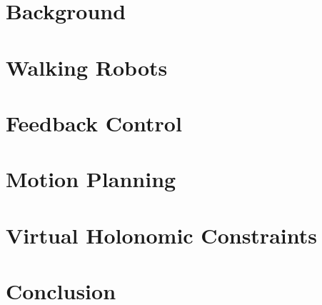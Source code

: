 \section{Background}

\clearpage
\section{Walking Robots}

\clearpage
\section{Feedback Control} \label{sec:feedback}
 
\clearpage
\section{Motion Planning}

\clearpage
\section{Virtual Holonomic Constraints}\label{sec:virtconstraint}

\clearpage
\section{Conclusion}
